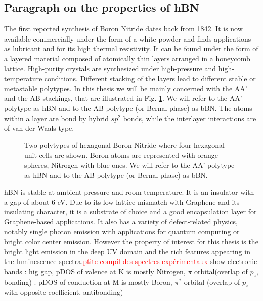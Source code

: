 \subsection{Paragraph on the properties of hBN}
The first reported synthesis of Boron Nitride dates back from 1842.\cite{balmain1842xlvi} It is now available commercially under the form of a white powder and finds applications as lubricant and for its high thermal resistivity. It can be found under the form of a layered material composed of atomically thin layers arranged in a honeycomb lattice. High-purity crystals are synthesized under high-pressure and high-temperature conditions.\cite{watanabe2004direct} 
Different stacking of the layers lead to different stable or metastable polytypes. In this thesis we will be mainly concerned with the AA' and the AB stackings, that are illustrated in Fig. \ref{fig:hBN_stackings}. We will refer to the AA' polytype as hBN and to the AB polytype (or Bernal phase) as bBN. The atoms within a layer are bond by hybrid $sp^2$ bonds, while the interlayer interactions are of van der Waals type.
\begin{figure}[h!b]%
	\vspace{0.2cm}
	\setcapindent{2em}
	\centering
     \qquad
    \caption{Two polytypes of hexagonal Boron Nitride where four hexagonal unit cells are shown. Boron atoms are represented with orange spheres, Nitrogen with blue ones. We will refer to the AA' polytype as hBN and to the AB polytype (or Bernal phase) as bBN.}
	\label{fig:hBN_stackings}
\end{figure}
%
hBN is stable at ambient pressure and room temperature. It is an insulator with a gap of about 6 eV. Due to its low lattice mismatch with Graphene and its insulating character, it is a substrate of choice and a good encapsulation layer for Graphene-based applications.\cite{somethg} It also has a variety of defect-related physics, notably single photon emission with applications for quantum computing\cite{QC} or bright color center emission. However the property of interest for this thesis is the bright light emission in the deep UV domain and the rich features appearing in the luminescence spectra.\textcolor{red}{ptite compil des spectres expérimentaux}
%
show electronic bands : hig gap, pDOS of valence at K is mostly Nitrogen, $\pi$ orbital(overlap of $p_z$, bonding)  . pDOS of conduction at M is mostly Boron, $\pi^*$ orbital (overlap of $p_z$ with opposite coefficient, antibonding)\\

